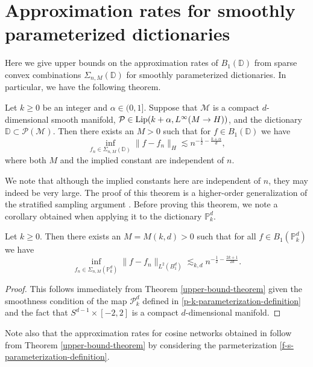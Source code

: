 \section{Approximation rates for smoothly parameterized dictionaries}
Here we give upper bounds on the approximation rates of $B_1(\mathbb{D})$ from sparse convex combinations $\Sigma_{n,M}(\mathbb{D})$ for smoothly parameterized dictionaries. In particular, we have the following theorem. 
\begin{theorem}\label{upper-bound-theorem}
 Let $k \geq 0$ be an integer and $\alpha\in (0,1]$. Suppose that $\mathcal{M}$ is a compact $d$-dimensional smooth manifold, $\mathcal{P}\in {\rm Lip}(k+\alpha, L^\infty(M\rightarrow H))$, and the dictionary $\mathbb{D}\subset \mathcal{P}(\mathcal{M})$. Then there exists an $M > 0$ such that for $f\in B_1(\mathbb{D})$ we have
 \begin{equation}
 \inf_{f_n\in \Sigma_{n,M}(\mathbb{D})} \|f - f_n\|_{H} \lesssim n^{-\frac{1}{2} - \frac{k+\alpha}{d}},
 \end{equation}
 where both $M$ and the implied constant are independent of $n$.
\end{theorem}
We note that although the implied constants here are independent of $n$, they may indeed be very large. The proof of this theorem is a higher-order generalization of the stratified sampling argument \cite{makovoz1996random,klusowski2018approximation}.
Before proving this theorem, we note a corollary obtained when applying it to the dictionary $\mathbb{P}^d_k$. 
\begin{theorem}\label{relu-k-rate-corollary}
 Let $k\geq 0$. Then there exists an $M = M(k,d) > 0$ such that for all $f\in B_1(\mathbb{P}^d_k)$ we have
 \begin{equation}
  \inf_{f_n\in \Sigma_{n,M}(\mathbb{P}^d_k)} \|f - f_n\|_{L^2(B_1^d)} \lesssim_{k,d} n^{-\frac{1}{2}-\frac{2k+1}{2d}}.
 \end{equation}
\end{theorem}
\begin{proof}
 This follows immediately from Theorem \ref{upper-bound-theorem} given the smoothness condition of the map $\mathcal{P}^d_k$ defined in \eqref{p-k-parameterization-definition} and the fact that $S^{d-1}\times [-2,2]$ is a compact $d$-dimensional manifold. 
\end{proof}

Note also that the approximation rates for cosine networks obtained in \cite{siegel2020high} follow from Theorem \ref{upper-bound-theorem} by considering the parmeterization \eqref{f-s-parameterization-definition}.


